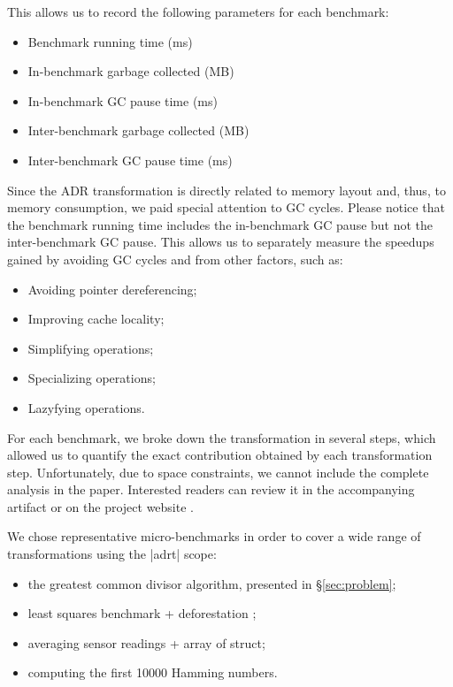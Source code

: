 This allows us to record the following parameters for each benchmark:

\begin{itemize}
  \item Benchmark running time (ms)
  \item In-benchmark garbage collected (MB)
  \item In-benchmark GC pause time (ms)
  \item Inter-benchmark garbage collected (MB)
  \item Inter-benchmark GC pause time (ms)
\end{itemize}


\noindent
Since the ADR transformation is directly related to memory layout and, thus, to memory consumption, we paid special attention to GC cycles. Please notice that the benchmark running time includes the in-benchmark GC pause but not the inter-benchmark GC pause. This allows us to separately measure the speedups gained by avoiding GC cycles and from other factors, such as:

\begin{itemize}
  \item Avoiding pointer dereferencing;
  \item Improving cache locality;
  \item Simplifying operations;
  \item Specializing operations;
  \item Lazyfying operations.
\end{itemize}


\noindent
For each benchmark, we broke down the transformation in several steps, which allowed us to quantify the exact contribution obtained by each transformation step. Unfortunately, due to space constraints, we cannot include the complete analysis in the paper. Interested readers can review it in the accompanying artifact or on the project website \cite{ildl-plugin-wiki}.


\noindent
We chose representative micro-benchmarks in order to cover a wide range of transformations using the |adrt| scope:

\begin{itemize}
\item the greatest common divisor algorithm, presented in \S\ref{sec:problem};
\item least squares benchmark + deforestation \cite{wadler-deforestation};
\item averaging sensor readings + array of struct;
\item computing the first 10000 Hamming numbers.
\end{itemize}


